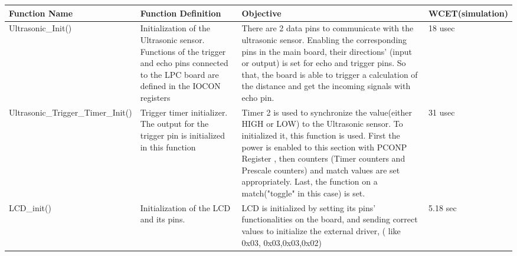 \documentclass{article}
\begin{document}
\begin{tabular}{| C{4cm} | C{4cm} | C{4cm} | C{2cm} |}
\hline
\textbf{Function Name} &\textbf{Function Definition}  & \textbf{Objective} &\textbf{WCET}\linebreak(simulation)\\
\hline
Ultrasonic\_Init() & Initialization of the Ultrasonic sensor. Functions of the trigger
and echo pins connected to the LPC board are defined in the IOCON registers& There are 2 data pins to
communicate with the ultrasonic sensor. Enabling the corresponding pins in the main board, their directions'
(input or output) is set for echo and trigger pins. So that, the board is able to trigger a calculation
of the distance and get the incoming signals with echo pin.& 18 usec\\
\hline
Ultrasonic\_Trigger\_Timer\_Init()&Trigger timer initializer. The output for the trigger pin is
 initialized in this function & Timer 2 is used to synchronize the value(either HIGH or LOW) to the Ultrasonic
 sensor. To initialized it, this function is used. First the power is enabled to this section with PCONP Register
 , then counters (Timer counters and Prescale counters) and match values are set appropriately. Last, the
 function on a match("toggle" in this case) is set. & 31 usec\\
\hline
LCD\_init()&Initialization of the LCD and its pins.& LCD is initialized by setting its pins' functionalities on the board,
and sending correct values to initialize the external driver, ( like 0x03, 0x03,0x03,0x02)&5.18 sec\\
\hline
\end{tabular}
\end{document}
